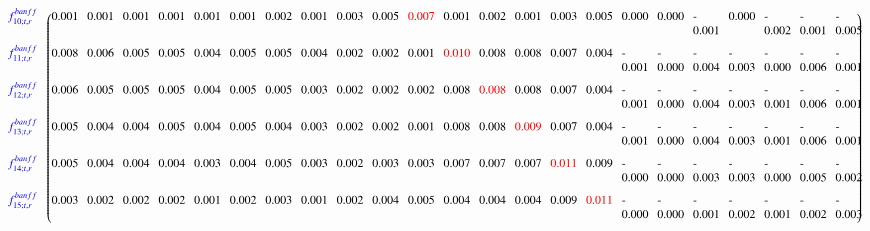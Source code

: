 {\begin{sideways}
\begin{minipage}{23cm}
{\begin{equation*}
\begin{blockarray}{c p{18pt}p{18pt}p{18pt}p{18pt}p{18pt}p{18pt}p{18pt}p{18pt}p{18pt}p{18pt}p{18pt}p{18pt}p{18pt}p{18pt}p{18pt}p{18pt}p{18pt}p{18pt}p{18pt}p{18pt}p{18pt}p{18pt}p{18pt}}
\begin{block}{c(p{18pt}p{18pt}p{18pt}p{18pt}p{18pt}p{18pt}p{18pt}p{18pt}p{18pt}p{18pt}p{18pt}p{18pt}p{18pt}p{18pt}p{18pt}p{18pt}p{18pt}p{18pt}p{18pt}p{18pt}p{18pt}p{18pt}p{18pt}@{\hspace*{1pt}})}
{\color{blue} f_{10; t, r}^{banff}}  \vspace{0.2cm} &      0.001 &      0.001 &      0.001 &      0.001 &      0.001 &      0.001 &      0.002 &      0.001 &      0.003 &      0.005 & {\color{red} 0.007} &      0.001 &      0.002 &      0.001 &      0.003 &      0.005 &      0.000 &      0.000 &     -0.001 &      0.000 &     -0.002 &     -0.001 &     -0.005 \\ 
{\color{blue} f_{11; t, r}^{banff}}  \vspace{0.2cm} &      0.008 &      0.006 &      0.005 &      0.005 &      0.004 &      0.005 &      0.005 &      0.004 &      0.002 &      0.002 &      0.001 & {\color{red} 0.010} &      0.008 &      0.008 &      0.007 &      0.004 &     -0.001 &     -0.000 &     -0.004 &     -0.003 &     -0.000 &     -0.006 &     -0.001 \\ 
{\color{blue} f_{12; t, r}^{banff}}  \vspace{0.2cm} &      0.006 &      0.005 &      0.005 &      0.005 &      0.004 &      0.005 &      0.005 &      0.003 &      0.002 &      0.002 &      0.002 &      0.008 & {\color{red} 0.008} &      0.008 &      0.007 &      0.004 &     -0.001 &     -0.000 &     -0.004 &     -0.003 &     -0.001 &     -0.006 &     -0.001 \\ 
{\color{blue} f_{13; t, r}^{banff}}  \vspace{0.2cm} &      0.005 &      0.004 &      0.004 &      0.005 &      0.004 &      0.005 &      0.004 &      0.003 &      0.002 &      0.002 &      0.001 &      0.008 &      0.008 & {\color{red} 0.009} &      0.007 &      0.004 &     -0.001 &     -0.000 &     -0.004 &     -0.003 &     -0.001 &     -0.006 &     -0.001 \\ 
{\color{blue} f_{14; t, r}^{banff}}  \vspace{0.2cm} &      0.005 &      0.004 &      0.004 &      0.004 &      0.003 &      0.004 &      0.005 &      0.003 &      0.002 &      0.003 &      0.003 &      0.007 &      0.007 &      0.007 & {\color{red} 0.011} &      0.009 &     -0.000 &     -0.000 &     -0.003 &     -0.003 &     -0.000 &     -0.005 &     -0.002 \\ 
{\color{blue} f_{15; t, r}^{banff}}  \vspace{0.2cm} &      0.003 &      0.002 &      0.002 &      0.002 &      0.001 &      0.002 &      0.003 &      0.001 &      0.002 &      0.004 &      0.005 &      0.004 &      0.004 &      0.004 &      0.009 & {\color{red} 0.011} &     -0.000 &     -0.000 &     -0.001 &     -0.002 &     -0.001 &     -0.002 &     -0.003 \\ 

\end{block}
\end{blockarray}
\end{equation*}}
\end{minipage}
\end{sideways}}
